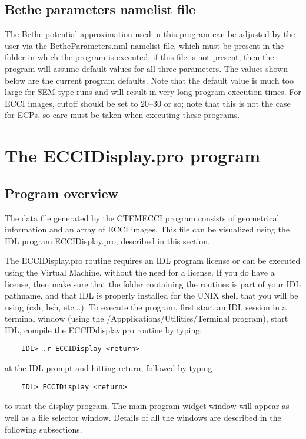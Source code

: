 \documentclass[DIV=calc, paper=letter, fontsize=11pt]{scrartcl}	 %
\begin{document}
\subsection{Bethe parameters namelist file\label{sec:f90BetheParameters}}
The Bethe potential approximation used in this program can be adjusted by the
user via the \textsf{BetheParameters.nml} namelist file, which must be present 
in the folder in which the program is executed; if this file is not present, then the
program will assume default values for all three parameters.  The values shown below
are the current program defaults.
Note that the default value  is much too large for SEM-type runs and will result in very long program execution times.
For ECCI images, \textsf{cutoff} should be set to $20$--$30$ or so; note that this is not the case for ECPs, so care 
must be taken when executing these programs.

\section{The \protect\textsf{ECCIDisplay.pro} program\label{sec:idl}}

\subsection{Program overview\label{sec:idloverview}}
The data file generated by the \textsf{CTEMECCI} program consists of geometrical information and an array of ECCI images.
This file can be visualized using the IDL program \textsf{ECCIDisplay.pro}, described in this section.

The \textsf{ECCIDisplay.pro} routine requires an IDL program license or can be executed using the Virtual Machine, without the need for a license. 
If you do have a license, then make sure that the folder containing the routines is part of your IDL pathname,
and that IDL is properly installed for the UNIX shell that you will be using (csh, bsh, etc...).
To execute the program, first start an IDL session in a terminal window (using the /Appplications/Utilities/Terminal program), 
start IDL, compile the \textsf{ECCIDdisplay.pro} routine by typing:
\begin{verbatim}
	IDL> .r ECCIDisplay <return>
\end{verbatim}
at the IDL prompt and hitting return, followed by typing 
\begin{verbatim}
	IDL> ECCIDisplay <return>
\end{verbatim}
to start the display program.  The main program widget window will appear as well as a file selector window.  
Details of all the windows are described in the following subsections.
\end{document}
